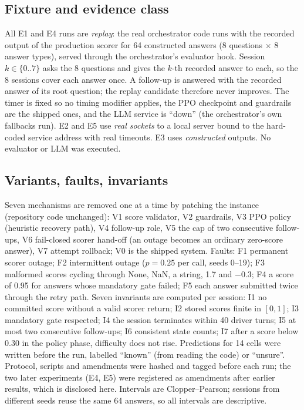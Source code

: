 \documentclass[runningheads]{llncs}
\begin{document}
\subsection{Fixture and evidence class}
All E1 and E4 runs are \emph{replay}: the real orchestrator code runs with the recorded output of the production scorer for 64 constructed answers (8 questions $\times$ 8 answer types), served through the orchestrator's evaluator hook. Session $k\in\{0..7\}$ asks the 8 questions and gives the $k$-th recorded answer to each, so the 8 sessions cover each answer once. A follow-up is answered with the recorded answer of its root question; the replay candidate therefore never improves. The timer is fixed so no timing modifier applies, the PPO checkpoint and guardrails are the shipped ones, and the LLM service is ``down'' (the orchestrator's own fallbacks run). E2 and E5 use \emph{real sockets} to a local server bound to the hard-coded service address with real timeouts. E3 uses \emph{constructed} outputs. No evaluator or LLM was executed.

\subsection{Variants, faults, invariants}
Seven mechanisms are removed one at a time by patching the instance (repository code unchanged): V1 score validator, V2 guardrails, V3 PPO policy (heuristic recovery path), V4 follow-up role, V5 the cap of two consecutive follow-ups, V6 fail-closed scorer hand-off (an outage becomes an ordinary zero-score answer), V7 attempt rollback; V0 is the shipped system. Faults: F1 permanent scorer outage; F2 intermittent outage ($p=0.25$ per call, seeds 0--19); F3 malformed scores cycling through None, NaN, a string, 1.7 and $-0.3$; F4 a score of 0.95 for answers whose mandatory gate failed; F5 each answer submitted twice through the retry path. Seven invariants are computed per session: I1 no committed score without a valid scorer return; I2 stored scores finite in $[0,1]$; I3 mandatory gate respected; I4 the session terminates within 40 driver turns; I5 at most two consecutive follow-ups; I6 consistent state counts; I7 after a score below 0.30 in the policy phase, difficulty does not rise. Predictions for 14 cells were written before the run, labelled ``known'' (from reading the code) or ``unsure''. Protocol, scripts and amendments were hashed and tagged before each run; the two later experiments (E4, E5) were registered as amendments after earlier results, which is disclosed here. Intervals are Clopper--Pearson; sessions from different seeds reuse the same 64 answers, so all intervals are descriptive.
\end{document}
